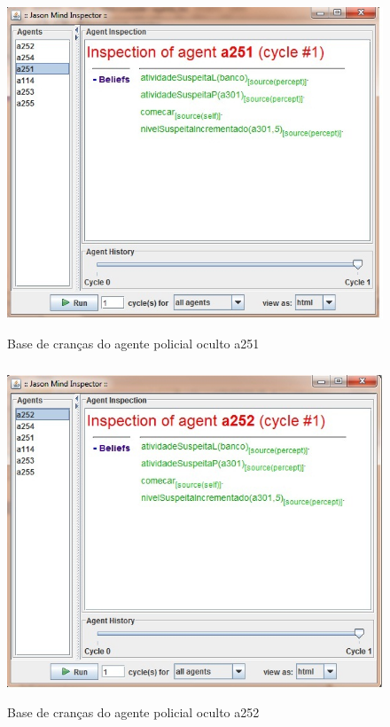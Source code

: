 \begin{figure}
\centering
\includegraphics [height=10cm]{figuras/crencas_policial251.jpg}
\caption{Base de cranças do agente policial oculto a251}
\label{baseA251}
\end{figure}
\begin{figure}
\centering
\includegraphics [height=10cm]{figuras/crencas_policial252.jpg}
\caption{Base de cranças do agente policial oculto a252}
\label{baseA252}
\end{figure}
